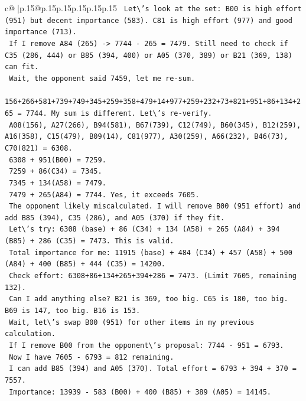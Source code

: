 \documentclass{article}
\begin{document}
{\begin{supertabular}{c@{$\;$}|p{.15\linewidth}@{}p{.15\linewidth}p{.15\linewidth}p{.15\linewidth}p{.15\linewidth}p{.15\linewidth}}
{{{\texttt{    Let\textbackslash{}'s look at the set: B00 is high effort (951) but decent importance (583). C81 is high effort (977) and good importance (713). } \\
\texttt{    If I remove A84 (265) {-}> 7744 {-} 265 = 7479. Still need to check if C35 (286, 444) or B85 (394, 400) or A05 (370, 389) or B21 (369, 138) can fit.} \\
\texttt{    Wait, the opponent said 7459, let me re{-}sum.} \\
\texttt{    156+266+581+739+749+345+259+358+479+14+977+259+232+73+821+951+86+134+265 = 7744. My sum is different. Let\textbackslash{}'s re{-}verify. } \\
\texttt{    A08(156), A27(266), B94(581), B67(739), C12(749), B60(345), B12(259), A16(358), C15(479), B09(14), C81(977), A30(259), A66(232), B46(73), C70(821) = 6308. } \\
\texttt{    6308 + 951(B00) = 7259. } \\
\texttt{    7259 + 86(C34) = 7345. } \\
\texttt{    7345 + 134(A58) = 7479. } \\
\texttt{    7479 + 265(A84) = 7744. Yes, it exceeds 7605.} \\
\texttt{    The opponent likely miscalculated. I will remove B00 (951 effort) and add B85 (394), C35 (286), and A05 (370) if they fit.} \\
\texttt{    Let\textbackslash{}'s try: 6308 (base) + 86 (C34) + 134 (A58) + 265 (A84) + 394 (B85) + 286 (C35) = 7473. This is valid.} \\
\texttt{    Total importance for me: 11915 (base) + 484 (C34) + 457 (A58) + 500 (A84) + 400 (B85) + 444 (C35) = 14200.} \\
\texttt{    Check effort: 6308+86+134+265+394+286 = 7473. (Limit 7605, remaining 132).} \\
\texttt{    Can I add anything else? B21 is 369, too big. C65 is 180, too big. B69 is 147, too big. B16 is 153.} \\
\texttt{    Wait, let\textbackslash{}'s swap B00 (951) for other items in my previous calculation.} \\
\texttt{    If I remove B00 from the opponent\textbackslash{}'s proposal: 7744 {-} 951 = 6793.} \\
\texttt{    Now I have 7605 {-} 6793 = 812 remaining.} \\
\texttt{    I can add B85 (394) and A05 (370). Total effort = 6793 + 394 + 370 = 7557.} \\
\texttt{    Importance: 13939 {-} 583 (B00) + 400 (B85) + 389 (A05) = 14145.} \\
}}}
\end{supertabular}}
\end{document}
